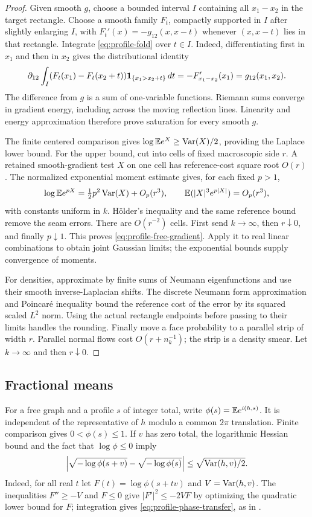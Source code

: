 \begin{proof}
Given smooth $g$, choose a bounded interval $I$ containing all
$x_1-x_2$ in the target rectangle. Choose a smooth family $F_t$,
compactly supported in $I$ after slightly enlarging $I$, with
$F_t'(x)=-g_{12}(x,x-t)$ whenever $(x,x-t)$ lies in that rectangle.
Integrate \eqref{eq:profile-fold} over $t\in I$. Indeed, differentiating first in
$x_1$ and then in $x_2$ gives the distributional identity
\[
 \partial_{12}\int_I
 (F_t(x_1)-F_t(x_2+t))\mathbf 1_{\{x_1>x_2+t\}}\,dt
          =-F'_{x_1-x_2}(x_1)=g_{12}(x_1,x_2).
\]
The difference from $g$ is a sum of one-variable functions. Riemann
sums converge in gradient energy, including across the moving
reflection lines. Linearity and energy approximation therefore prove
saturation for every smooth $g$.

The finite centered comparison gives
$\log\mathbb E e^X\ge\operatorname{Var}(X)/2$, providing the Laplace lower bound.
For the upper bound, cut into cells of fixed macroscopic side $r$.
A retained smooth-gradient test $X$ on one cell has reference-cost
square root $O(r)$. The normalized exponential moment estimate gives,
for each fixed $p>1$,
\[
 \log\mathbb E e^{pX}=\tfrac12p^2\operatorname{Var}(X)+O_p(r^3),
 \qquad \mathbb E(|X|^3e^{p|X|})=O_p(r^3),
\]
with constants uniform in $k$. H\"older's inequality and the same
reference bound remove the seam errors. There are $O(r^{-2})$ cells.
First send $k\to\infty$, then $r\downarrow0$, and finally
$p\downarrow1$. This proves \eqref{eq:profile-free-gradient}.
Apply it to real linear combinations to obtain joint Gaussian limits;
the exponential bounds supply convergence of moments.

For densities, approximate by finite sums of Neumann eigenfunctions
and use their smooth inverse-Laplacian shifts. The discrete Neumann
form approximation and Poincar\'e inequality bound the reference cost
of the error by its squared scaled $L^2$ norm. Using the actual
rectangle endpoints before passing to their limits handles the
rounding. Finally move a face probability to a parallel strip of
width $r$. Parallel normal flows cost $O(r+n_k^{-1})$; the strip is a
density smear. Let $k\to\infty$ and then $r\downarrow0$.
\end{proof}

\subsection{Fractional means}

For a free graph and a profile $s$ of integer total, write
$\phi(s)=\mathbb E e^{i(h,s)}$. It is independent of the representative of
$h$ modulo a common $2\pi$ translation. Finite comparison gives
$0<\phi(s)\le1$. If $v$ has zero total, the logarithmic Hessian bound
and the fact that $\log\phi\le0$ imply
\begin{equation}\label{eq:profile-phase-transfer}
 \left|\sqrt{-\log\phi(s+v)}-\sqrt{-\log\phi(s)}\right|
                  \le\sqrt{\operatorname{Var}(h,v)/2}.
\end{equation}
Indeed, for all real $t$ let $F(t)=\log\phi(s+tv)$ and
$V=\operatorname{Var}(h,v)$. The inequalities $F''\ge-V$ and $F\le0$ give
$|F'|^2\le-2VF$ by optimizing the quadratic lower bound for $F$;
integration gives \eqref{eq:profile-phase-transfer}, as in
\cite[Equation~(2.2)]{X}.

